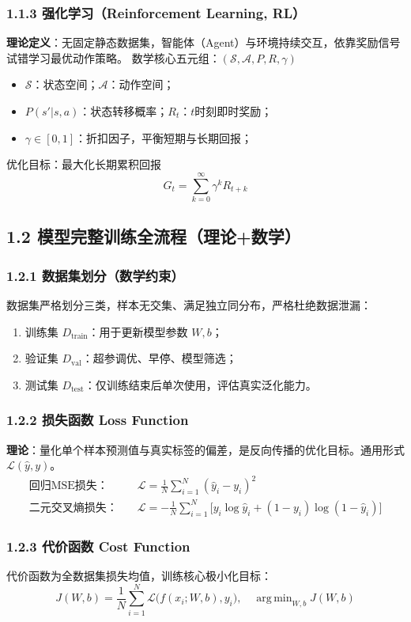 \documentclass[11pt,a4paper]{article}
\DeclareMathOperator*{\argmin}{arg\,min}
\begin{document}
\subsubsection{1.1.3 强化学习（Reinforcement Learning, RL）}
\textbf{理论定义}：无固定静态数据集，智能体（Agent）与环境持续交互，依靠奖励信号试错学习最优动作策略。
数学核心五元组：$(\mathcal{S},\mathcal{A},P,R,\gamma)$
\begin{itemize}[leftmargin=*]
\item $\mathcal{S}$：状态空间；$\mathcal{A}$：动作空间；
\item $P(s'|s,a)$：状态转移概率；$R_t$：$t$时刻即时奖励；
\item $\gamma\in[0,1]$：折扣因子，平衡短期与长期回报；
\end{itemize}
优化目标：最大化长期累积回报
\[
G_t=\sum_{k=0}^{\infty}\gamma^k R_{t+k}
\]

\subsection{1.2 模型完整训练全流程（理论+数学）}
\subsubsection{1.2.1 数据集划分（数学约束）}
数据集严格划分三类，样本无交集、满足独立同分布，严格杜绝数据泄漏：
\begin{enumerate}
\item 训练集 $D_{\text{train}}$：用于更新模型参数 $W,b$；
\item 验证集 $D_{\text{val}}$：超参调优、早停、模型筛选；
\item 测试集 $D_{\text{test}}$：仅训练结束后单次使用，评估真实泛化能力。
\end{enumerate}

\subsubsection{1.2.2 损失函数 Loss Function}
\textbf{理论}：量化单个样本预测值与真实标签的偏差，是反向传播的优化目标。通用形式 $\mathcal{L}(\hat{y},y)$。
\begin{align*}
\text{回归MSE损失：}&\quad \mathcal{L}=\frac{1}{N}\sum_{i=1}^N (\hat{y}_i-y_i)^2 \\
\text{二元交叉熵损失：}&\quad \mathcal{L}=-\frac{1}{N}\sum_{i=1}^N \big[y_i\log\hat{y}_i + (1-y_i)\log(1-\hat{y}_i)\big]
\end{align*}

\subsubsection{1.2.3 代价函数 Cost Function}
代价函数为全数据集损失均值，训练核心极小化目标：
\[
J(W,b)=\frac{1}{N}\sum_{i=1}^N \mathcal{L}\big(f(x_i;W,b),y_i\big),\quad \argmin_{W,b} J(W,b)
\]
\end{document}
